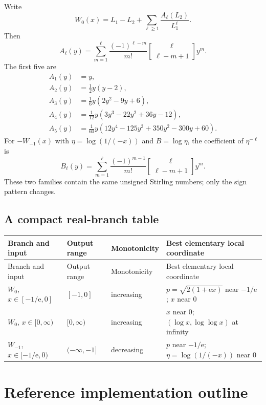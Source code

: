 \documentclass[11pt,oneside]{book}
\theoremstyle{definition}
\theoremstyle{remark}
\newcommand{\ee}{\mathrm e}
\newcommand{\stirlingone}[2]{\genfrac{[}{]}{0pt}{}{#1}{#2}}
\begin{document}
Write
\[
 W_0(x)=L_1-L_2+\sum_{\ell\ge1}\frac{A_\ell(L_2)}{L_1^\ell}.
\]
Then
\begin{equation}\label{eq:Aell}
 A_\ell(y)=
 \sum_{m=1}^{\ell}
 \frac{(-1)^{\ell-m}}{m!}
 \stirlingone{\ell}{\ell-m+1}y^m.
\end{equation}
The first five are
\begin{align*}
 A_1(y)&=y,\\
 A_2(y)&=\frac12y(y-2),\\
 A_3(y)&=\frac16y(2y^2-9y+6),\\
 A_4(y)&=\frac1{12}y(3y^3-22y^2+36y-12),\\
 A_5(y)&=\frac1{60}y(12y^4-125y^3+350y^2-300y+60).
\end{align*}
For $-W_{-1}(x)$ with $\eta=\log(1/(-x))$ and $B=\log\eta$, the coefficient
of $\eta^{-\ell}$ is
\begin{equation}\label{eq:Bell}
 B_\ell(y)=
 \sum_{m=1}^{\ell}
 \frac{(-1)^{m-1}}{m!}
 \stirlingone{\ell}{\ell-m+1}y^m.
\end{equation}
These two families contain the same unsigned Stirling numbers; only the sign
pattern changes.

\section{A compact real-branch table}

\begin{center}
\begin{longtable}{@{}p{}p{}p{}p{}@{}}
\toprule
Branch and input & Output range & Monotonicity & Best elementary local coordinate\\
\midrule
\endfirsthead
\toprule
Branch and input & Output range & Monotonicity & Best elementary local coordinate\\
\midrule
\endhead
$W_0$, $x\in[-1/\ee,0]$ & $[-1,0]$ & increasing &
$p=\sqrt{2(1+\ee x)}$ near $-1/\ee$; $x$ near $0$\\
$W_0$, $x\in[0,\infty)$ & $[0,\infty)$ & increasing &
$x$ near $0$; $(\log x,\log\log x)$ at infinity\\
$W_{-1}$, $x\in[-1/\ee,0)$ & $(-\infty,-1]$ & decreasing &
$p$ near $-1/\ee$; $\eta=\log(1/(-x))$ near $0$\\
\bottomrule
\end{longtable}
\end{center}


\chapter{Reference implementation outline}\label{app:implementation}
\end{document}
